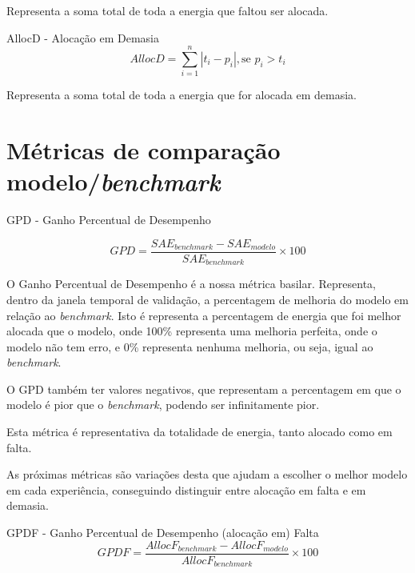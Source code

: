 Representa a soma total de toda a energia que faltou ser alocada.\par
\bigskip
AllocD - Alocação em Demasia \\


\begin{equation} \label{eq:allocd} 
    AllocD = \sum_{i=1}^{n}\left|t_i - p_i \right| , \text{se } p_i > t_i
\end{equation}
\smallskip

Representa a soma total de toda a energia que for alocada em demasia.\par

\section{Métricas de comparação modelo/\textit{benchmark}}

GPD - Ganho Percentual de Desempenho

\begin{equation} \label{eq:gpd} 
    GPD = \frac{SAE_{benchmark} - SAE_{modelo}}{SAE_{benchmark}} \times 100
\end{equation}
\smallskip

O Ganho Percentual de Desempenho é a nossa métrica basilar. Representa, dentro da janela temporal de validação, a percentagem de melhoria do modelo em relação ao \textit{benchmark}. Isto é representa a percentagem de energia que foi melhor alocada que o modelo, onde 100\% representa uma melhoria perfeita, onde o modelo não tem erro, e 0\% representa nenhuma melhoria, ou seja, igual ao \textit{benchmark}. \par
O GPD também ter valores negativos, que representam a percentagem em que o modelo é pior que o \textit{benchmark}, podendo ser infinitamente pior.\par
Esta métrica é representativa da totalidade de energia, tanto alocado como em falta.\par
As próximas métricas são variações desta que ajudam a escolher o melhor modelo em cada experiência, conseguindo distinguir entre alocação em falta e em demasia.\par
\bigskip
GPDF - Ganho Percentual de Desempenho (alocação em) Falta\\

\begin{equation} \label{eq:gpdf} 
    GPDF = \frac{AllocF_{benchmark} - AllocF_{modelo}}{AllocF_{benchmark}} \times 100
\end{equation}
\smallskip

